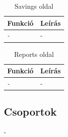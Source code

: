 \begin{table}[H]
	\centering
	\begin{tabular}{ | m{} | m{} | }
		\hline
		\textbf{Funkció} & \textbf{Leírás} \\
		\hline \hline
		\emph{-} & - \\
		\hline
	\end{tabular}
	\caption{Savings oldal}
	\label{tab:savings}
\end{table}

\begin{table}[H]
	\centering
	\begin{tabular}{ | m{} | m{} | }
		\hline
		\textbf{Funkció} & \textbf{Leírás} \\
		\hline \hline
		\emph{-} & - \\
		\hline
	\end{tabular}
	\caption{Reports oldal}
	\label{tab:reports}
\end{table}

\subsection{Csoportok}
-